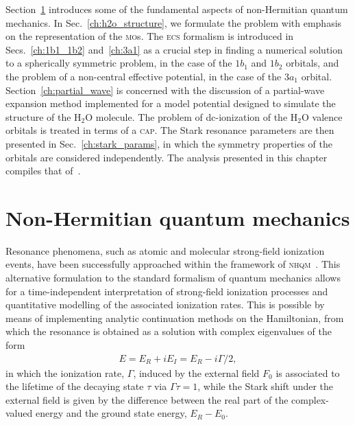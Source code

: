 Section~\ref{ch:nonH_qm} introduces some of the fundamental aspects of
non-Hermitian quantum mechanics. In Sec.~\ref{ch:h2o_structure}, we
formulate the problem with emphasis on the representation of the
\textsc{mo}s. The \textsc{ecs} formalism is introduced in
Secs.~\ref{ch:1b1_1b2} and~\ref{ch:3a1} as a crucial step in finding a
numerical solution to a spherically symmetric problem, in the case of
the $1b_{1}$ and $1b_{2}$ orbitals, and the problem of a non-central
effective potential, in the case of the $3a_{1}$
orbital. Section~\ref{ch:partial_wave} is concerned with the
discussion of a partial-wave expansion method implemented for a model
potential designed to simulate the structure of the H$_{2}$O
molecule. The problem of dc-ionization of the H$_{2}$O valence
orbitals is treated in terms of a \textsc{cap}. The Stark resonance
parameters are then presented in Sec.~\ref{ch:stark_params}, in which
the symmetry properties of the orbitals are considered
independently. The analysis presented in this chapter compiles that
of~\cite{sarias_2016,sarias_2017}.


\section{Non-Hermitian quantum mechanics}
\label{ch:nonH_qm}

Resonance phenomena, such as atomic and molecular strong-field
ionization events, have been successfully approached within the
framework of \textsc{nhqm}~\cite{Moiseyev_NHQM}. This alternative
formulation to the standard formalism of quantum mechanics allows for
a time-independent interpretation of strong-field ionization processes
and quantitative modelling of the associated ionization rates. This is
possible by means of implementing analytic continuation methods on the
Hamiltonian, from which the resonance is obtained as a solution with
complex eigenvalues of the form
%
\begin{eqnarray}
  E = E_{R} + i E_{I} = E_{R} - i \Gamma/2,
  \label{eq:complex_eigenE}
\end{eqnarray}
%
in which the ionization rate, $\Gamma$, induced by the external field
$F_{0}$ is associated to the lifetime of the decaying state $\tau$ via
$\Gamma\tau = 1$, while the Stark shift under the external field is
given by the difference between the real part of the complex-valued
energy and the ground state energy, $E_{R} - E_{0}$.

